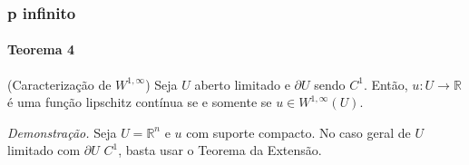 \documentclass[a4paper, 11pt]{book}
\newcommand{\R}{\mathbb{R}}
\newcommand{\rn}{{\mathbb{R}^n}}
\newcommand{\pu}{\partial U}
\begin{document}
\subsubsection{p infinito}

\paragraph{Teorema 4}\label{t:sobolev-quociente-de-diferenças-infinito} (Caracterização de $W^{1,\infty}$) Seja $U$ aberto limitado e $\pu$ sendo $C^1$. Então, $u:U\rightarrow\R$ é uma função lipschitz contínua se e somente se $u \in W^{1,\infty}(U)$.

\textit{Demonstração.} Seja $U=\rn$ e $u$ com suporte compacto.
No caso geral de $U$ limitado com $\pu$ $C^1$, basta usar o Teorema da Extensão.
\end{document}
